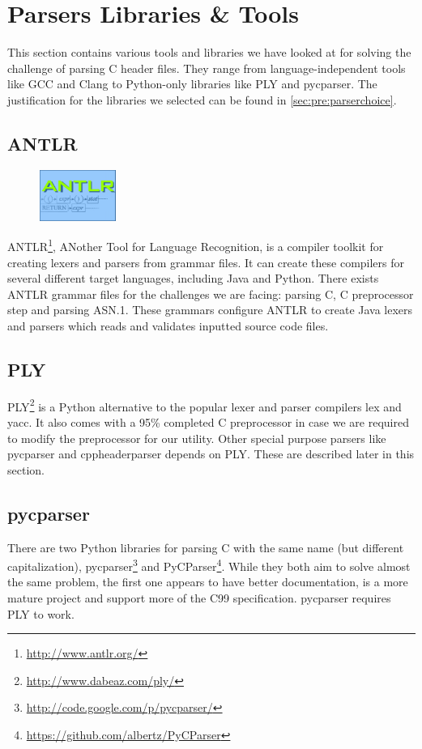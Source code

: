 \section{Parsers Libraries \& Tools}
\label{sec:pre:parsers}
This section contains various tools and libraries we have looked at for solving
the challenge of parsing C header files. They range from language-independent
tools like GCC and Clang to Python-only libraries like PLY and pycparser. The
justification for the libraries we selected can be found in
\autoref{sec:pre:parserchoice}.

\subsection{ANTLR}
\label{sec:pre:antlr}
\begin{figure}
	\vspace{-20pt}
	\includegraphics[width=2.5cm]{./planning/img/antlr_logo}
	\vspace{-20pt}
\end{figure}
ANTLR\footnote{\url{http://www.antlr.org/}}, ANother Tool for Language
Recognition, is a compiler toolkit for creating lexers and parsers from grammar
files. It can create these compilers for several different target languages,
including Java and Python. There exists ANTLR grammar files for the challenges
we are facing: parsing C, C preprocessor step and parsing ASN.1. These grammars
configure ANTLR to create Java lexers and parsers which reads and validates
inputted source code files.

\subsection{PLY}
PLY\footnote{\url{http://www.dabeaz.com/ply/}} is a Python alternative to the
popular lexer and parser compilers lex and yacc. It also comes with a 95\%
completed C preprocessor in case we are required to modify the preprocessor
for our utility. Other special purpose parsers like pycparser and
cppheaderparser depends on PLY. These are described later in this section.

\subsection{pycparser}
\label{sec:pre:pycparser}
There are two Python libraries for parsing C with the same name (but different
capitalization), pycparser\footnote{\url{http://code.google.com/p/pycparser/}}
and PyCParser\footnote{\url{https://github.com/albertz/PyCParser}}. While they
both aim to solve almost the same problem, the first one appears to have better
documentation, is a more mature project and support more of the C99
specification. pycparser requires PLY to work.

